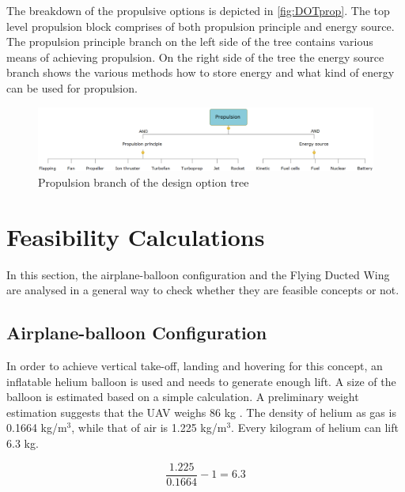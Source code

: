 The breakdown of the propulsive options is depicted in \autoref{fig:DOTprop}. The top level propulsion block comprises of both propulsion principle and energy source. The propulsion principle branch on the left side of the tree contains various means of achieving propulsion. On the right side of the tree the energy source branch shows the various methods how to store energy and what kind of energy can be used for propulsion.

\begin{figure}[H]
\centering
\includegraphics[width=1\textwidth]{Concepts/Figures/Propulsion}
\caption{Propulsion branch of the design option tree}
\label{fig:DOTprop}
\end{figure}

\section{Feasibility Calculations}
\label{sec:feas_calc}
In this section, the airplane-balloon configuration and the Flying Ducted Wing are analysed in a general way to check whether they are feasible concepts or not.

\subsection{Airplane-balloon Configuration}
In order to achieve vertical take-off, landing and hovering for this concept, an inflatable helium balloon is used and needs to generate enough lift. A size of the balloon is estimated based on a simple calculation. A preliminary weight estimation suggests that the UAV weighs 86 kg \cite{baseline}. The density of helium as gas is 0.1664 kg/m$^3$\footnotemark, while that of air is 1.225 kg/m$^3$. Every kilogram of helium can lift 6.3 kg.

$$ \frac{1.225}{0.1664} - 1 = 6.3$$

